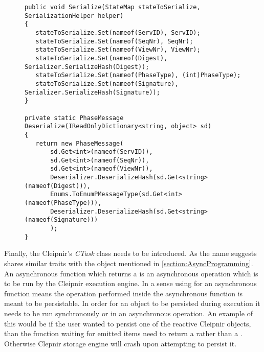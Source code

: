 \begin{figure}[H]
	\centering
	\begin{lstlisting}[label = code:seriadeseria, caption=Serialize/Deserialize code example, captionpos=b, basicstyle=\scriptsize]
public void Serialize(StateMap stateToSerialize, SerializationHelper helper)
{
   stateToSerialize.Set(nameof(ServID), ServID);
   stateToSerialize.Set(nameof(SeqNr), SeqNr);
   stateToSerialize.Set(nameof(ViewNr), ViewNr);
   stateToSerialize.Set(nameof(Digest), Serializer.SerializeHash(Digest));
   stateToSerialize.Set(nameof(PhaseType), (int)PhaseType);
   stateToSerialize.Set(nameof(Signature), Serializer.SerializeHash(Signature));
}

private static PhaseMessage Deserialize(IReadOnlyDictionary<string, object> sd)
{
   return new PhaseMessage(
       sd.Get<int>(nameof(ServID)),
       sd.Get<int>(nameof(SeqNr)),
       sd.Get<int>(nameof(ViewNr)),
       Deserializer.DeserializeHash(sd.Get<string>(nameof(Digest))),
       Enums.ToEnumPMessageType(sd.Get<int>(nameof(PhaseType))),
       Deserializer.DeserializeHash(sd.Get<string>(nameof(Signature)))
       );
}
	\end{lstlisting}
\end{figure}

\iffalse
Finally, the Cleipnir’s \emph{CTask} class needs to be introduced. As the name suggests  shares similar traits with the  object mentioned in \autoref{section:AsyncProgramming}. An asynchronous function which returns a  is an asynchronous operation which is to be run by the Cleipnir execution engine. In a sense using  for an asynchronous function means the operation performed inside the asynchronous function is meant to be persistable. In order for an object to be persisted during execution it needs to be run synchronously or in an asynchronous  operation. An example of this would be if the user wanted to persist one of the reactive Cleipnir  objects, than the function waiting for emitted items need to return a  rather than a . Otherwise Clepnir storage engine will crash upon attempting to persist it.

